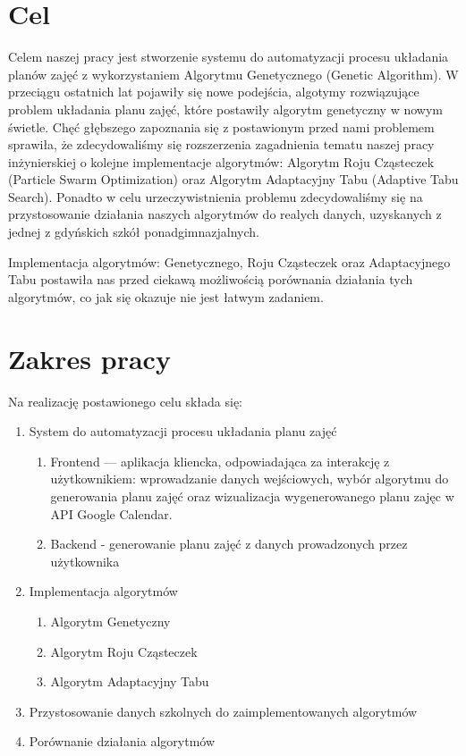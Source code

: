 \section{Cel}
\par Celem naszej pracy jest stworzenie systemu do automatyzacji procesu układania planów zajęć z wykorzystaniem Algorytmu Genetycznego (Genetic Algorithm).  W przeciągu ostatnich lat pojawiły się nowe podejścia, algotymy rozwiązujące problem układania planu zajęć, które postawiły algorytm genetyczny w nowym świetle. Chęć głębszego zapoznania się z postawionym przed nami problemem sprawiła, że zdecydowaliśmy się rozszerzenia zagadnienia tematu naszej pracy inżynierskiej o kolejne implementacje algorytmów: Algorytm Roju Cząsteczek (Particle Swarm Optimization) oraz Algorytm Adaptacyjny Tabu (Adaptive Tabu Search). Ponadto w celu urzeczywistnienia problemu zdecydowaliśmy się na przystosowanie działania naszych algorytmów do realych danych, uzyskanych z jednej z gdyńskich szkół ponadgimnazjalnych.
\par Implementacja algorytmów: Genetycznego, Roju Cząsteczek oraz Adaptacyjnego Tabu postawiła nas przed ciekawą możliwością porównania działania tych algorytmów, co jak się okazuje nie jest łatwym zadaniem.
\section{Zakres pracy}
\par Na realizację postawionego celu składa się:
\begin{enumerate}
\item System do automatyzacji procesu układania planu zajęć
\begin{enumerate}
\item Frontend — aplikacja kliencka, odpowiadająca za interakcję z użytkownikiem: wprowadzanie danych wejściowych, wybór algorytmu do generowania planu zajęć oraz wizualizacja wygenerowanego planu zajęc w API Google Calendar.
\item Backend - generowanie planu zajęć z danych prowadzonych przez użytkownika 
\end{enumerate}
\item Implementacja algorytmów
\begin{enumerate}
\item Algorytm Genetyczny
\item Algorytm Roju Cząsteczek
\item Algorytm Adaptacyjny Tabu
\end{enumerate}
\item Przystosowanie danych szkolnych do zaimplementowanych algorytmów
\item Porównanie działania algorytmów



\end{enumerate}


